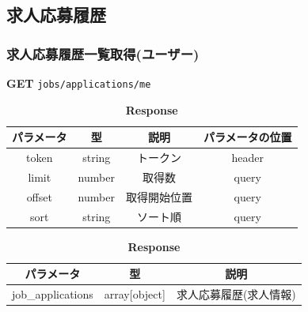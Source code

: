 \subsection{求人応募履歴}
\subsubsection*{求人応募履歴一覧取得(ユーザー)}
\textbf{GET} \texttt{jobs/applications/me}
\begin{table}[H]
  \begin{minipage}
    {0.5\hsize} \centering \captionsetup{labelformat=empty,labelsep=none} \caption{\textbf{Request}}
    \small
    \begin{tabular}{|c|c|c|c|} \hline
      パラメータ  & 型      & 説明     & パラメータの位置 \\ \hline \hline
      token  & string & トークン   & header   \\ \hline
      limit  & number & 取得数    & query    \\ \hline
      offset & number & 取得開始位置 & query    \\ \hline
      sort   & string & ソート順   & query    \\ \hline
    \end{tabular}
  \end{minipage}
  \begin{minipage}
    {0.5\hsize}
    \centering
    \captionsetup{labelformat=empty,labelsep=none}
    \caption{\textbf{Response}}
    \begin{tabular}{|c|c|c|} \hline
      パラメータ             & 型             & 説明           \\ \hline \hline
      job\_applications & array[object] & 求人応募履歴(求人情報) \\ \hline
    \end{tabular}
  \end{minipage}
\end{table}

